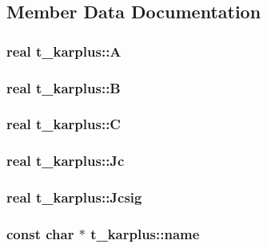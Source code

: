\subsection{\-Member \-Data \-Documentation}
\hypertarget{structt__karplus_a64462f049206b6e6f4b14df1e07f42e9}{
\subsubsection[{\-A}]{\setlength{\rightskip}{0pt plus 5cm}real {\bf t\-\_\-karplus\-::\-A}}}\label{structt__karplus_a64462f049206b6e6f4b14df1e07f42e9}
\hypertarget{structt__karplus_ad33849c507587b6b27042b9f8d586d76}{
\subsubsection[{\-B}]{\setlength{\rightskip}{0pt plus 5cm}real {\bf t\-\_\-karplus\-::\-B}}}\label{structt__karplus_ad33849c507587b6b27042b9f8d586d76}
\hypertarget{structt__karplus_ae279fc4e14d35ddd3261f53610cb7139}{
\subsubsection[{\-C}]{\setlength{\rightskip}{0pt plus 5cm}real {\bf t\-\_\-karplus\-::\-C}}}\label{structt__karplus_ae279fc4e14d35ddd3261f53610cb7139}
\hypertarget{structt__karplus_a50e969c1dea12eb4b89c353c802a72e7}{
\subsubsection[{\-Jc}]{\setlength{\rightskip}{0pt plus 5cm}real {\bf t\-\_\-karplus\-::\-Jc}}}\label{structt__karplus_a50e969c1dea12eb4b89c353c802a72e7}
\hypertarget{structt__karplus_a107287868225d1aba3253324437fbdcc}{
\subsubsection[{\-Jcsig}]{\setlength{\rightskip}{0pt plus 5cm}real {\bf t\-\_\-karplus\-::\-Jcsig}}}\label{structt__karplus_a107287868225d1aba3253324437fbdcc}
\hypertarget{structt__karplus_adab1bc4d8afd2e8423204f0ff4f1f6fa}{
\subsubsection[{name}]{\setlength{\rightskip}{0pt plus 5cm}const char $\ast$ {\bf t\-\_\-karplus\-::name}}}\label{structt__karplus_adab1bc4d8afd2e8423204f0ff4f1f6fa}
